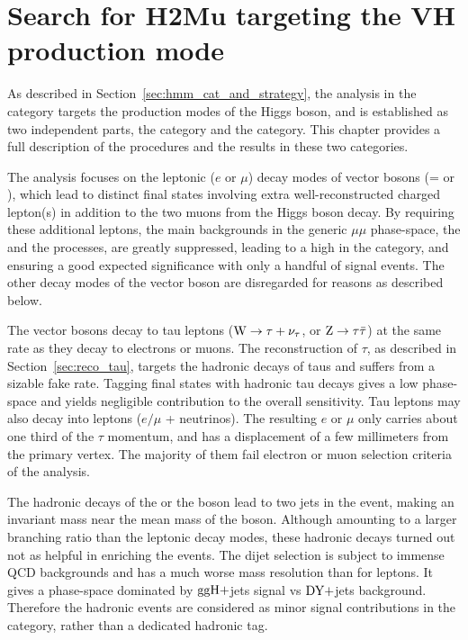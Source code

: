 \chapter{Search for H2Mu targeting the VH production mode}\label{chp:VH_analysis}

As described in Section~\ref{sec:hmm_cat_and_strategy}, the analysis in the \VH category targets the \VH production modes of the Higgs boson, 
and is established as two independent parts, the \WH category and the \ZH category.
This chapter provides a full description of the procedures and the results in these two categories.

The \VH analysis focuses on the leptonic ($e$ or $\mu$) decay modes of vector bosons (\PV = \PW or \PZ), 
which lead to distinct final states involving extra well-reconstructed charged lepton(s) in addition to the two muons from the Higgs boson decay.
By requiring these additional leptons, the main backgrounds in the generic $\mu\mu$ phase-space, the \DY and the \ttbar processes, are greatly suppressed,
leading to a high \SoB in the \VH category, and ensuring a good expected significance with only a handful of signal events.
The other decay modes of the vector boson are disregarded for reasons as described below.

The vector bosons decay to tau leptons ($\mathrm{W} \to \tau+\nu_{\tau}$, or $\mathrm{Z} \to \tau\bar{\tau}$) at the same rate as they decay to electrons or muons. 
The reconstruction of $\tau$, as described in Section~\ref{sec:reco_tau}, 
targets the hadronic decays of taus and suffers from a sizable fake rate.
Tagging final states with hadronic tau decays gives a low \SoB phase-space 
and yields negligible contribution to the overall sensitivity.
Tau leptons may also decay into leptons ($e/\mu$ + neutrinos).
The resulting $e$ or $\mu$ only carries about one third of the $\tau$ momentum, 
and has a displacement of a few millimeters from the primary vertex.
The majority of them fail electron or muon selection criteria of the analysis.

The hadronic decays of the \PW or the \PZ boson lead to two jets in the event, making an invariant mass near the mean mass of the boson.
Although amounting to a larger branching ratio than the leptonic decay modes, these hadronic decays turned out not as helpful in enriching the \VH events.
The dijet selection is subject to immense QCD backgrounds and has a much worse mass resolution than for leptons. 
It gives a phase-space dominated by $\mathrm{g}\mathrm{g}\mathrm{H}+$jets signal vs $\mbox{DY}+$jets background.
Therefore the hadronic \VH events are considered as minor signal contributions in the \ggH category, 
rather than a dedicated \VH hadronic tag.

